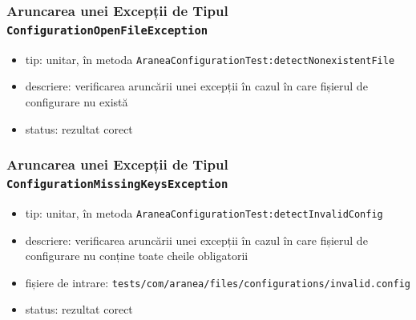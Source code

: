 \documentclass[12pt]{article}
\begin{document}
\subsubsection{Aruncarea unei Excepții de Tipul \texttt{ConfigurationOpenFileException}}

\begin{itemize}
    \item tip: unitar, în metoda \texttt{AraneaConfigurationTest:detectNonexistentFile}
    \item descriere: verificarea aruncării unei excepții în cazul în care fișierul de configurare nu există
    \item status: rezultat corect
\end{itemize}

\subsubsection{Aruncarea unei Excepții de Tipul \texttt{ConfigurationMissingKeysException}}

\begin{itemize}
    \item tip: unitar, în metoda \texttt{AraneaConfigurationTest:detectInvalidConfig}
    \item descriere: verificarea aruncării unei excepții în cazul în care fișierul de configurare nu conține toate cheile obligatorii
    \item fișiere de intrare: \texttt{tests/com/aranea/files/configurations/invalid.config}
    \item status: rezultat corect
\end{itemize}
\end{document}
